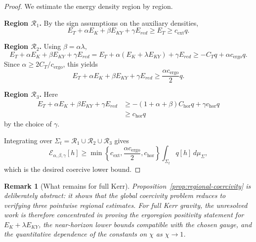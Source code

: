\documentclass[12pt,a4paper]{article}
\newtheorem{remark}[theorem]{Remark}
\begin{document}
\begin{proof}
We estimate the energy density region by region.

\textbf{Region $\mathcal{R}_1$.}
By the sign assumptions on the auxiliary densities,
\begin{equation}
E_T + \alpha E_K + \beta E_{KY} + \gamma E_{red} \ge E_T \ge c_{\mathrm{ext}} q.
\end{equation}

\textbf{Region $\mathcal{R}_2$.}
Using $\beta = \alpha \lambda$,
\begin{equation}
E_T + \alpha E_K + \beta E_{KY} + \gamma E_{red}
= E_T + \alpha(E_K + \lambda E_{KY}) + \gamma E_{red}
\ge -C_T q + \alpha c_{\mathrm{ergo}} q.
\end{equation}
Since $\alpha \ge 2C_T/c_{\mathrm{ergo}}$, this yields
\begin{equation}
E_T + \alpha E_K + \beta E_{KY} + \gamma E_{red}
\ge \frac{\alpha c_{\mathrm{ergo}}}{2} q.
\end{equation}

\textbf{Region $\mathcal{R}_3$.}
Here
\begin{align}
E_T + \alpha E_K + \beta E_{KY} + \gamma E_{red}
&\ge -\left(1+\alpha+\beta\right)C_{\mathrm{hor}} q + \gamma c_{\mathrm{hor}} q \\
&\ge c_{\mathrm{hor}} q
\end{align}
by the choice of $\gamma$.

Integrating over $\Sigma_t = \mathcal{R}_1 \cup \mathcal{R}_2 \cup \mathcal{R}_3$ gives
\begin{equation}
\mathcal{E}_{\alpha,\beta,\gamma}[h]
\ge
\min\left\{c_{\mathrm{ext}}, \frac{\alpha c_{\mathrm{ergo}}}{2}, c_{\mathrm{hor}}\right\}
\int_{\Sigma_t} q[h]\,d\mu_{\Sigma},
\end{equation}
which is the desired coercive lower bound.
\end{proof}

\begin{remark}[What remains for full Kerr]
Proposition~\ref{prop:regional-coercivity} is deliberately abstract: it shows that the global coercivity problem reduces to verifying three pointwise regional estimates. For full Kerr gravity, the unresolved work is therefore concentrated in proving the ergoregion positivity statement for $E_K+\lambda E_{KY}$, the near-horizon lower bounds compatible with the chosen gauge, and the quantitative dependence of the constants on $\chi$ as $\chi\to 1$.
\end{remark}
\end{document}
